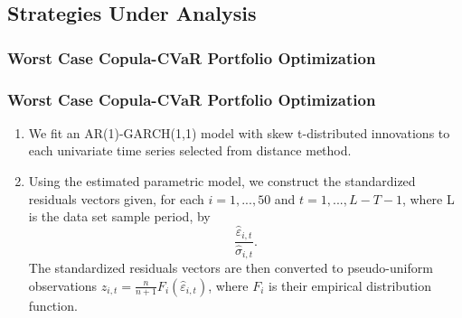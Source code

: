\documentclass[pdf,9pt,xcolor=dvipsnames,hide notes]{beamer}
\begin{document}
%	
%			
%			
%			
%			
%			
%			
%			
%		
%	

\subsection{Strategies Under Analysis}

\subsubsection{Worst Case Copula-CVaR Portfolio Optimization}
\begin{frame}[label=frame5]
\frametitle{Worst Case Copula-CVaR Portfolio Optimization}

\begin{enumerate}
	\setcounter{enumi}{0}
\justifying
\item We fit an AR(1)-GARCH(1,1) model with skew t-distributed
innovations to each univariate time series selected from distance method.

\vspace{0.3cm}

\item Using the estimated parametric model, we construct the standardized
residuals vectors given, for each $i=1,...,50$ and $t=1,...,L-T-1$, where L is the data set sample period, by
\begin{equation*}
\frac{\widehat{\varepsilon }_{i,t}}{\widehat{\sigma }_{i,t}}.
\end{equation*}%
The standardized residuals vectors are then converted to pseudo-uniform
observations $z_{i,t}=\frac{n}{n+1}F_{i}\left( \widehat{\varepsilon }%
_{i,t}\right) $, where $F_{i}$ is their empirical distribution function.

 
 \end{enumerate}

\end{frame}
\end{document}
